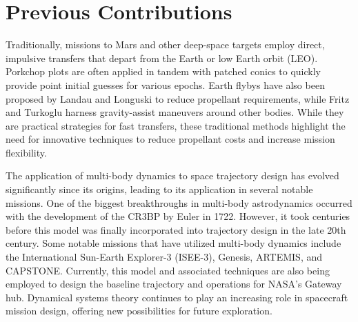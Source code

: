 \section{Previous Contributions}
Traditionally, missions to Mars and other deep-space targets employ direct, impulsive transfers
that depart from the Earth or low Earth orbit (LEO). Porkchop plots are often applied in tandem
with patched conics to quickly provide point initial guesses for various epochs\cite{Drake:2009}.
Earth flybys have also been proposed by Landau and Longuski to reduce propellant
requirements\cite{Landau:2006}, while Fritz and Turkoglu harness gravity-assist maneuvers around
other bodies\cite{Fritz:2016}. While they are practical strategies for fast transfers, these
traditional methods highlight the need for innovative techniques to reduce propellant costs and
increase mission flexibility.

The application of multi-body dynamics to space trajectory design has evolved significantly since
its origins, leading to its application in several notable missions. One of the biggest
breakthroughs in multi-body astrodynamics occurred with the development of the CR3BP by Euler in
1722\cite{BarrowGreen:1997}. However, it took centuries before this model was finally incorporated
into trajectory design in the late 20th century. Some notable missions that have utilized
multi-body dynamics include the International Sun-Earth Explorer-3 (ISEE-3)\cite{Farquhar:1984},
Genesis\cite{Lo:2001}, ARTEMIS\cite{Woodard:2009}, and CAPSTONE\cite{Cheetham:2021}. Currently,
this model and associated techniques are also being employed to design the baseline trajectory and
operations for NASA's Gateway hub\cite{Zamora:2024,Boudad:2022,ZimovanSpreen:2022}. Dynamical
systems theory continues to play an increasing role in spacecraft mission design, offering new
possibilities for future exploration.

